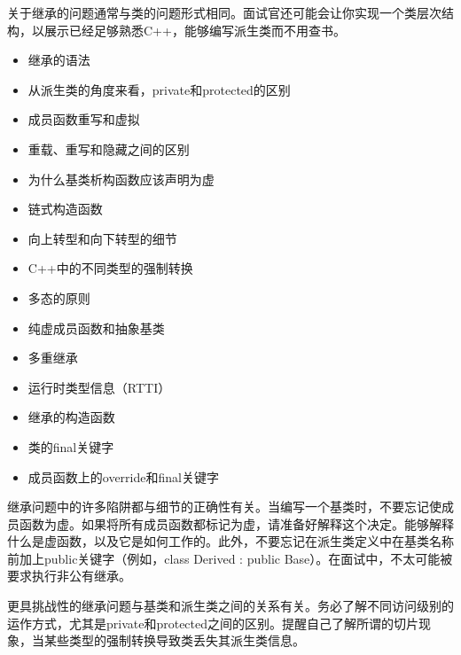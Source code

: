 
关于继承的问题通常与类的问题形式相同。面试官还可能会让你实现一个类层次结构，以展示已经足够熟悉C++，能够编写派生类而不用查书。


\begin{itemize}
\item
继承的语法

\item
从派生类的角度来看，private和protected的区别

\item
成员函数重写和虚拟

\item
重载、重写和隐藏之间的区别

\item
为什么基类析构函数应该声明为虚

\item
链式构造函数

\item
向上转型和向下转型的细节

\item
C++中的不同类型的强制转换

\item
多态的原则

\item
纯虚成员函数和抽象基类

\item
多重继承

\item
运行时类型信息（RTTI）

\item
继承的构造函数

\item
类的final关键字

\item
成员函数上的override和final关键字
\end{itemize}


继承问题中的许多陷阱都与细节的正确性有关。当编写一个基类时，不要忘记使成员函数为虚。如果将所有成员函数都标记为虚，请准备好解释这个决定。能够解释什么是虚函数，以及它是如何工作的。此外，不要忘记在派生类定义中在基类名称前加上public关键字（例如，class Derived : public Base）。在面试中，不太可能被要求执行非公有继承。

更具挑战性的继承问题与基类和派生类之间的关系有关。务必了解不同访问级别的运作方式，尤其是private和protected之间的区别。提醒自己了解所谓的切片现象，当某些类型的强制转换导致类丢失其派生类信息。











